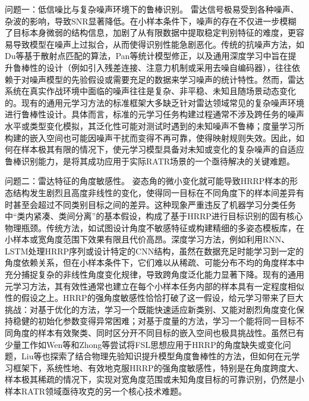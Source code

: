 问题一：低信噪比与复杂噪声环境下的鲁棒识别。
雷达信号极易受到各种噪声、杂波的影响，导致SNR显著降低。在小样本条件下，噪声的存在不仅进一步模糊了目标本身微弱的结构信息，加剧了从有限数据中提取稳定判别特征的难度，更容易导致模型在噪声上过拟合，从而使得识别性能急剧恶化。传统的抗噪声方法，如Du等基于散射点匹配的算法，Pan等统计模型修正，以及通用深度学习中旨在提升鲁棒性的设计（例如引入残差连接、注意力机制或采用去噪自编码器），往往依赖于对噪声模型的先验假设或需要充足的数据来学习噪声的统计特性。然而，雷达系统在真实作战环境中面临的噪声往往是复杂、非平稳、未知且随场景动态变化的。现有的通用元学习方法的标准框架大多缺乏针对雷达领域常见的复杂噪声环境进行鲁棒性设计。具体而言，标准的元学习任务构建过程通常不涉及跨任务的噪声水平或类型变化模拟，其泛化性可能对测试时遇到的未知噪声不鲁棒；度量学习所构建的嵌入空间也可能因噪声干扰而变得不再可靠，使得映射规则失效。因此，如何在样本极其有限的情况下，使元学习模型具备对未知或变化的复杂噪声的自适应鲁棒识别能力，是将其成功应用于实际RATR场景的一个亟待解决的关键难题。

问题二：雷达特征的角度敏感性。
姿态角的微小变化就可能导致HRRP样本的形态结构发生剧烈且高度非线性的变化，使得同一目标在不同角度下的样本间差异有时甚至会超过不同类别目标之间的差异。这种现象严重违反了机器学习分类任务中“类内紧凑、类间分离”的基本假设，构成了基于HRRP进行目标识别的固有核心物理瓶颈。传统方法，如试图设计角度不敏感特征或构建精细的多姿态模板库，在小样本或宽角度范围下效果有限且代价高昂。深度学习方法，例如利用RNN、LSTM处理HRRP序列或设计特定的CNN结构，虽然在数据充足时能学习到一定的角度依赖关系，但在小样本条件下，它们难以从稀疏、可能分布不均的角度样本中充分捕捉复杂的非线性角度变化规律，导致跨角度泛化能力显著下降。现有的通用元学习方法，其有效性通常也建立在每个小样本任务内部的样本具有一定程度相似性的假设之上。HRRP的强角度敏感性恰恰打破了这一假设，给元学习带来了巨大挑战：对基于优化的方法，学习一个既能快速适应新类别、又能对剧烈角度变化保持稳健的初始化参数变得异常困难；对基于度量的方法，学习一个能将同一目标不同角度的样本有效聚类、同时区分开不同目标的嵌入空间也极具挑战性。虽然已有少量工作如Wen等和Zhong等尝试将FSL思想应用于HRRP的角度缺失或变化问题，Liu等也探索了结合物理先验知识提升模型角度鲁棒性的方法，但如何在元学习框架下，系统性地、有效地克服HRRP的强角度敏感性，特别是在角度跨度大、样本极其稀疏的情况下，实现对宽角度范围或未知角度目标的可靠识别，仍然是小样本RATR领域亟待攻克的另一个核心技术难题。

